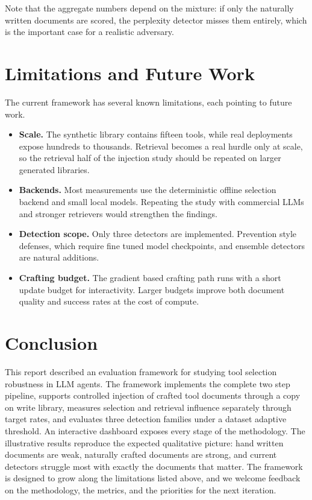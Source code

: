 \documentclass[11pt,a4paper]{report}
\begin{document}
Note that the aggregate numbers depend on the mixture: if only the
naturally written documents are scored, the perplexity detector misses
them entirely, which is the important case for a realistic adversary.

\chapter{Limitations and Future Work}

The current framework has several known limitations, each pointing to
future work.

\begin{itemize}
  \item \textbf{Scale.} The synthetic library contains fifteen tools,
  while real deployments expose hundreds to thousands. Retrieval becomes
  a real hurdle only at scale, so the retrieval half of the injection
  study should be repeated on larger generated libraries.
  \item \textbf{Backends.} Most measurements use the deterministic
  offline selection backend and small local models. Repeating the study
  with commercial LLMs and stronger retrievers would strengthen the
  findings.
  \item \textbf{Detection scope.} Only three detectors are implemented.
  Prevention style defenses, which require fine tuned model checkpoints,
  and ensemble detectors are natural additions.
  \item \textbf{Crafting budget.} The gradient based crafting path runs
  with a short update budget for interactivity. Larger budgets improve
  both document quality and success rates at the cost of compute.
\end{itemize}

\chapter{Conclusion}

This report described an evaluation framework for studying tool selection
robustness in LLM agents. The framework implements the complete two step
pipeline, supports controlled injection of crafted tool documents through
a copy on write library, measures selection and retrieval influence
separately through target rates, and evaluates three detection families
under a dataset adaptive threshold. An interactive dashboard exposes
every stage of the methodology. The illustrative results reproduce the
expected qualitative picture: hand written documents are weak, naturally
crafted documents are strong, and current detectors struggle most with
exactly the documents that matter. The framework is designed to grow
along the limitations listed above, and we welcome feedback on the
methodology, the metrics, and the priorities for the next iteration.
\end{document}
